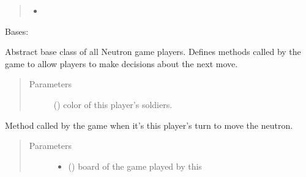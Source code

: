 \documentclass[letterpaper,10pt,english]{sphinxmanual}
\begin{document}
\begin{fulllineitems}
\begin{fulllineitems}
\begin{quote}
\begin{description}
\begin{itemize}
\item {} 
 \textendash{} 

\end{itemize}

\end{description}\end{quote}

\end{fulllineitems}


\end{fulllineitems}


\begin{fulllineitems}
\label{\detokenize{player:player.Player}}
Bases: 

Abstract base class of all Neutron game players. Defines methods called by
the game to allow players to make decisions about the next move.
\begin{quote}\begin{description}
\item[{Parameters}] \leavevmode
{} () \textendash{} color of this player’s soldiers.

\end{description}\end{quote}

\begin{fulllineitems}
\label{\detokenize{player:player.Player.move_neutron}}
Method called by the game when it’s this player’s turn to move the
neutron.
\begin{quote}\begin{description}
\item[{Parameters}] \leavevmode\begin{itemize}
\item {} 
 ({\hyperref[\detokenize{neutron:neutron.NeutronBoard}]{}}) \textendash{} board of the game played by this


\end{itemize}
\end{description}
\end{quote}
\end{fulllineitems}
\end{fulllineitems}
\end{document}
